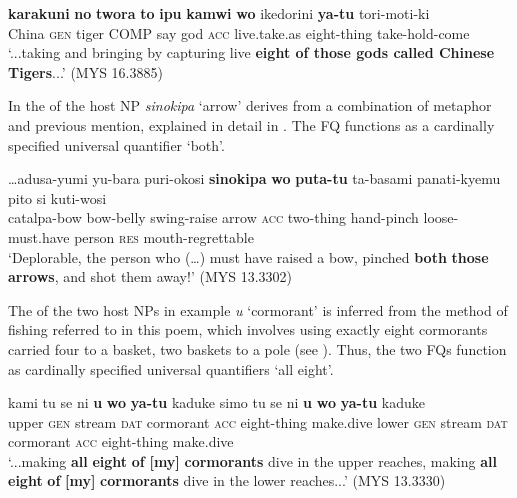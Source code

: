 \documentclass[output=paper]{LSP/langsci}
\begin{document}
\begin{exe}
\ex%
\label{07-fr-ex:9}
\gll \textbf{karakuni} \textbf{no} \textbf{twora} \textbf{to} \textbf{ipu} \textbf{kamwi} \textbf{wo} ikedorini \textbf{ya-tu} tori-moti-ki\\
China \textsc{gen} tiger COMP say god \textsc{acc} live.take.as eight-thing take-hold-come\\
\glt ‘...taking and bringing by capturing live \textbf{eight of those gods called Chinese Tigers}...’   (MYS 16.3885)
\end{exe}

In  the  of the host NP \textit{sinokipa} ‘arrow’
derives from a combination of metaphor and previous mention, explained
in detail in \citet{Frellesvigetal2015Differential}. The FQ functions
as a cardinally specified universal quantifier ‘both’.


\begin{exe}
\ex%
\label{07-fr-ex:10}
\gll …adusa-yumi yu-bara puri-okosi \textbf{sinokipa} \textbf{wo} \textbf{puta-tu} ta-basami panati-kyemu pito si kuti-wosi\\
catalpa-bow bow-belly swing-raise arrow \textsc{acc} two-thing hand-pinch loose-must.have person \textsc{res} mouth-regrettable\\
\glt ‘Deplorable, the person who (…) must have raised a bow, pinched \textbf{both} \textbf{those} \textbf{arrows}, and shot them away!’   (MYS 13.3302)
\end{exe}

The  of the two host NPs in example  \textit{u} ‘cormorant’ is inferred from the method of fishing referred to in this poem, which involves using exactly eight cormorants carried four to a basket, two baskets to a pole (see \citealt[202]{Frellesvigetal2015Differential}). 
Thus, the two FQs function as cardinally specified universal quantifiers ‘all eight’. 

\begin{exe}
\ex%
\label{07-fr-ex:11}
\gll kami tu se ni \textbf{u} \textbf{wo} \textbf{ya-tu} kaduke simo tu se ni \textbf{u} \textbf{wo} \textbf{ya-tu} kaduke\\
upper \textsc{gen} stream \textsc{dat} cormorant \textsc{acc} eight-thing make.dive lower \textsc{gen} stream \textsc{dat} cormorant \textsc{acc}  eight-thing make.dive\\
\glt ‘...making \textbf{all} \textbf{eight} \textbf{of} \textbf{[my]} \textbf{cormorants} dive in the upper reaches, making \textbf{all} \textbf{eight} \textbf{of} \textbf{[my]} \textbf{cormorants} dive in the lower reaches...’   (MYS 13.3330) 
\end{exe}
\end{document}
